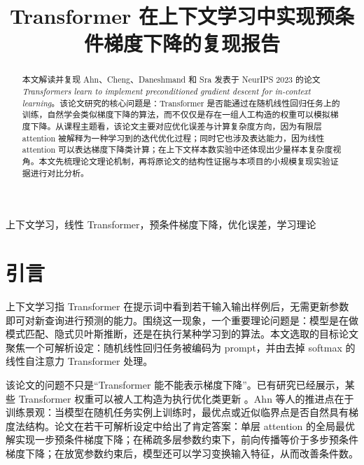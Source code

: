 \documentclass[conference]{IEEEtran}
\begin{document}
\title{Transformer 在上下文学习中实现预条件梯度下降的复现报告}

\author{
\and
{}
\and
{}
\and
{}
}

\maketitle

\begin{abstract}
本文解读并复现 Ahn、Cheng、Daneshmand 和 Sra 发表于 NeurIPS 2023 的论文 \emph{Transformers learn to implement preconditioned gradient descent for in-context learning}。该论文研究的核心问题是：Transformer 是否能通过在随机线性回归任务上的训练，自然学会类似梯度下降的算法，而不仅仅是存在一组人工构造的权重可以模拟梯度下降。从课程主题看，该论文主要对应优化误差与计算复杂度方向，因为有限层 attention 被解释为一种学习到的迭代优化过程；同时它也涉及表达能力，因为线性 attention 可以表达梯度下降类计算；在上下文样本数实验中还体现出少量样本复杂度视角。本文先梳理论文理论机制，再将原论文的结构性证据与本项目的小规模复现实验证据进行对比分析。
\end{abstract}

\begin{IEEEkeywords}
上下文学习，线性 Transformer，预条件梯度下降，优化误差，学习理论
\end{IEEEkeywords}

\section{引言}
上下文学习指 Transformer 在提示词中看到若干输入输出样例后，无需更新参数即可对新查询进行预测的能力。围绕这一现象，一个重要理论问题是：模型是在做模式匹配、隐式贝叶斯推断，还是在执行某种学习到的算法。本文选取的目标论文 \cite{ahn2023preconditioned} 聚焦一个可解析设定：随机线性回归任务被编码为 prompt，并由去掉 softmax 的线性自注意力 Transformer 处理。

该论文的问题不只是“Transformer 能不能表示梯度下降”。已有研究已经展示，某些 Transformer 权重可以被人工构造为执行优化类更新 \cite{akyurek2023learning,von2023transformers}。Ahn 等人的推进点在于训练景观：当模型在随机任务实例上训练时，最优点或近似临界点是否自然具有梯度法结构。论文在若干可解析设定中给出了肯定答案：单层 attention 的全局最优解实现一步预条件梯度下降；在稀疏多层参数约束下，前向传播等价于多步预条件梯度下降；在放宽参数约束后，模型还可以学习变换输入特征，从而改善条件数。
\end{document}
